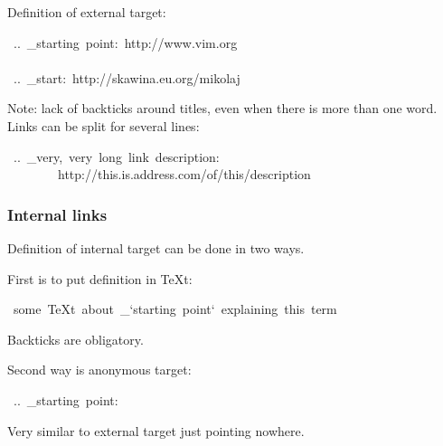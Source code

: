 \documentclass[12pt]{article}
\begin{document}
Definition of external target:

\begin{ttfamily}\begin{flushleft}
\mbox{~..~\_starting~point:~http://www.vim.org}\\
\mbox{}\\
\mbox{~..~\_start:~http://skawina.eu.org/mikolaj}\\
\end{flushleft}\end{ttfamily}

Note: lack of backticks around titles, even when there is more than one
word. Links can be split for several lines:

\begin{ttfamily}\begin{flushleft}
\mbox{~..~\_very,~very~long~link~description:}\\
\mbox{~~~~~~~~http://this.is.address.com/of/this/description}\\
\end{flushleft}\end{ttfamily}

\hypertarget{linternal-links}{}
\subsubsection{Internal links}

Definition of internal target can be done in two ways.

First is to put definition in \TeX{}t:

\begin{ttfamily}\begin{flushleft}
\mbox{~some~\TeX{}t~about~\_`starting~point`~explaining~this~term}\\
\end{flushleft}\end{ttfamily}

Backticks are obligatory.

Second way is anonymous target:

\begin{ttfamily}\begin{flushleft}
\mbox{~..~\_starting~point:}\\
\end{flushleft}\end{ttfamily}

Very similar to external target just pointing nowhere.

\hypertarget{lstandalone-links}{}
\end{document}
